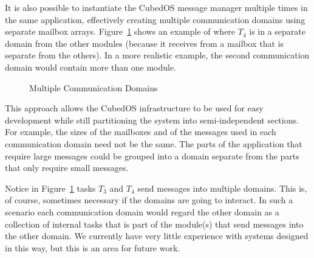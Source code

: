It is also possible to instantiate the CubedOS message manager multiple times in the same
application, effectively creating multiple communication domains using separate mailbox arrays.
Figure~\ref{fig:multi-domain} shows an example of where $T_4$ is in a separate domain from the
other modules (because it receives from a mailbox that is separate from the others). In a more
realistic example, the second communication domain would contain more than one module.

\begin{figure}[tbhp]
  \center
  \caption{Multiple Communication Domains}
  \label{fig:multi-domain}
\end{figure}

This approach allows the CubedOS infrastructure to be used for easy development while still
partitioning the system into semi-independent sections. For example, the sizes of the mailboxes
and of the messages used in each communication domain need not be the same. The parts of the
application that require large messages could be grouped into a domain separate from the parts
that only require small messages.

Notice in Figure~\ref{fig:multi-domain} tasks $T_3$ and $T_4$ send messages into multiple
domains. This is, of course, sometimes necessary if the domains are going to interact. In such a
scenario each communication domain would regard the other domain as a collection of internal
tasks that is part of the module(s) that send messages into the other domain. We currently have
very little experience with systems designed in this way, but this is an area for future work.
